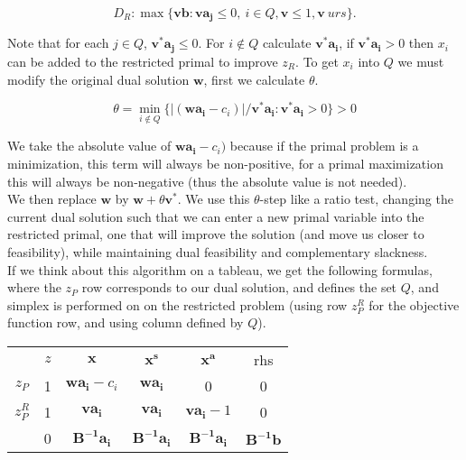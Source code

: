 $$D_R:\max\{\mathbf{vb}: \mathbf{va_j }\le 0,~ i \in Q, \mathbf{v} \le 1, \mathbf{v}~ urs\}.$$

Note that for each $j \in Q$, $\mathbf{v^*a_j} \le 0$. For $i \notin Q$ calculate $\mathbf{v^*a_i}$, if $\mathbf{v^*a_i} > 0$ then $x_i$ can be added to the restricted primal to improve $z_R$.  To get $x_i$ into $Q$ we must modify the original dual solution $\mathbf{w}$, first we calculate $\theta$.

$$ \theta = \min_{i \notin Q} \{|(\mathbf{wa_i}-c_i)|/\mathbf{v^*a_i} : \mathbf{v^*a_i} > 0\}  > 0$$ 

We take the absolute value of $\mathbf{wa_i}-c_i)$ because if the primal problem is a minimization, this term will always be non-positive, for a primal maximization this will always be non-negative (thus the absolute value is not needed). \\

We then replace $\mathbf{w}$ by $\mathbf{w}+\theta\mathbf{v^*}$.  We use this $\theta$-step like a ratio test, changing the current dual solution such that we can enter a new primal variable into the restricted primal, one that will improve the solution (and move us closer to feasibility), while maintaining dual feasibility and complementary slackness.  \\

If we think about this algorithm on a tableau, we get the following formulas, where the $z_P$ row corresponds to our dual solution, and defines the set $Q$, and simplex is performed on on the restricted problem (using row $z^R_P$ for the objective function row, and using column defined by $Q$). 

\begin{center} \begin{tabular} {c|c|c|c|c|c|} \cline{2-6}       
		& $z$ 	& $\mathbf{x}$ 			& $\mathbf{x^s}$ 		& $\mathbf{x^a}$	& rhs  \\ \cline{2-6}\cline{2-6} 
$z_P$  	& 1  	& $\mathbf{wa_i}-c_i$	& $\mathbf{wa_i}$		& 0					& 0    \\ \cline{2-6}
$z^R_P$ & 1		& $\mathbf{va_i} $   	& $\mathbf{va_i} $		& $\mathbf{va_i}-1$ & 0    \\ \cline{2-6} \cline{2-6}       
		& 0     & $\mathbf{B^{-1}a_i}$	& $\mathbf{B^{-1}a_i}$& $\mathbf{B^{-1}a_i}$ 	& $\mathbf{B^{-1}b}$   \\ \cline{2-6}
\end{tabular} \end{center}


